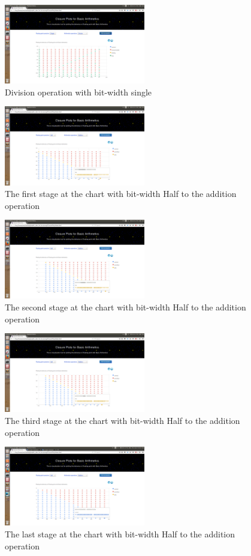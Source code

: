 \documentclass[11pt]{article}
\begin{document}
\begin{figure}[h]
    \centering
    \includegraphics[width=0.55\textwidth]{single-divi}
    \caption{Division operation with bit-width single}
    \label{single-div}
\end{figure}
\begin{figure}[h]
    \centering
    \includegraphics[width=0.55\textwidth]{first-stage-half-add}
    \caption{The first stage at the chart with bit-width Half to the addition operation}
    \label{first-stage}
\end{figure}
\begin{figure}[h]
    \centering
    \includegraphics[width=0.55\textwidth]{second-stage-half-add}
    \caption{The second stage at the chart with bit-width Half to the addition operation}
    \label{second-stage}
\end{figure}
\begin{figure}[h]
    \centering
    \includegraphics[width=0.55\textwidth]{third-stage-half-add}
    \caption{The third stage at the chart with bit-width Half to the addition operation }
    \label{third-stage}
\end{figure}
\begin{figure}[h]
    \centering
    \includegraphics[width=0.55\textwidth]{last-stage-half-add}
    \caption{The last stage at the chart with bit-width Half to the addition operation }
    \label{last-stage}
\end{figure}
\end{document}

